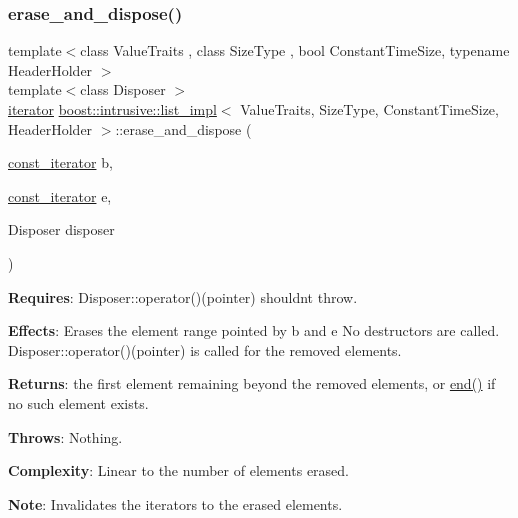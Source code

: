 \subsubsection{\texorpdfstring{erase\+\_\+and\+\_\+dispose()}{erase\_and\_dispose()}\hspace{0.1cm}{\footnotesize\ttfamily [3/3]}}
{\footnotesize\ttfamily template$<$class Value\+Traits , class Size\+Type , bool Constant\+Time\+Size, typename Header\+Holder $>$ \\
template$<$class Disposer $>$ \\
\hyperlink{classboost_1_1intrusive_1_1list__impl_a15c0189bf62eb9fb98bc07ef10b8cb23}{iterator} \hyperlink{classboost_1_1intrusive_1_1list__impl}{boost\+::intrusive\+::list\+\_\+impl}$<$ Value\+Traits, Size\+Type, Constant\+Time\+Size, Header\+Holder $>$\+::erase\+\_\+and\+\_\+dispose (\begin{DoxyParamCaption}\item[{\hyperlink{classboost_1_1intrusive_1_1list__impl_af4ced710fe02662c5650d161af83d8cd}{const\+\_\+iterator}}]{b,  }\item[{\hyperlink{classboost_1_1intrusive_1_1list__impl_af4ced710fe02662c5650d161af83d8cd}{const\+\_\+iterator}}]{e,  }\item[{Disposer}]{disposer }\end{DoxyParamCaption})\hspace{0.3cm}{\ttfamily [inline]}}

{\bfseries Requires}\+: Disposer\+::operator()(pointer) shouldn\textquotesingle{}t throw.

{\bfseries Effects}\+: Erases the element range pointed by b and e No destructors are called. Disposer\+::operator()(pointer) is called for the removed elements.

{\bfseries Returns}\+: the first element remaining beyond the removed elements, or \hyperlink{classboost_1_1intrusive_1_1list__impl_af2a454471fced6d4b2fb899c50bbee67}{end()} if no such element exists.

{\bfseries Throws}\+: Nothing.

{\bfseries Complexity}\+: Linear to the number of elements erased.

{\bfseries Note}\+: Invalidates the iterators to the erased elements. \mbox{\label{classboost_1_1intrusive_1_1list__impl_adfff2fc56d86000cced59427fecf0e90}} 
